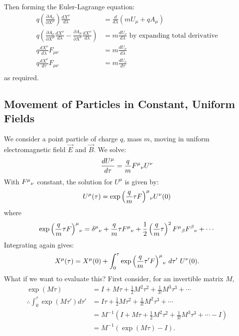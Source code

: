 \documentclass[../Main.tex]{subfiles}
\begin{document}
Then forming the Euler-Lagrange equation:
\begin{align*}
    q \left(\frac{\partial A_\nu}{\partial X^\mu}\right) \frac{dX^\nu}{d\lambda} &= \frac{d}{d\lambda}\left(mU_\mu + qA_\mu\right) \\
    q\left(\frac{\partial A_\nu}{\partial X^\mu} \frac{dX^\nu}{d\lambda} - \frac{\partial A_\mu}{\partial X^\nu} \frac{dX^\nu}{d\lambda}\right) &= m \frac{dU_\nu}{d\lambda} \text{ by expanding total derivative}\\
    q \frac{dX^\nu}{d\lambda} F_{\mu \nu} &= m \frac{dU_\nu}{d\lambda} \\
    q \frac{dX^\nu}{d\tau} F_{\mu \nu} &= m \frac{dU_\nu}{d\tau} \\
\end{align*}
as required.
\subsection{Movement of Particles in Constant, Uniform Fields}
We consider a point particle of charge $q$, mass $m$, moving in uniform electromagnetic field $\vec{E}$ and $\vec{B}$. We solve:
\begin{equation}
    \frac{dU^\mu}{d\tau} = \frac{q}{m} \indx{F}{\mu}{\nu} U^\nu
    \label{eqnForceRelLorentz2}
\end{equation}
With $\indx{F}{\mu}{\nu}$ constant, the solution for $U^\mu$ is given by:
\begin{equation*}
    U^\mu(\tau) = \indx{\exp\left(\frac{q}{m} \tau F\right)}{\mu}{\nu}U^\nu(0)
\end{equation*}
where
\begin{equation*}
    \indx{\exp\left(\frac{q}{m} \tau F\right)}{\mu}{\nu} = \indx\delta\mu\nu + \frac{q}{m}\tau \indx{F}\mu\nu + \frac12 \left(\frac{q}{m}\tau\right)^2 \indx{F}\mu\beta \indx{F}\beta\nu + \cdots
\end{equation*}
Integrating again gives:
\begin{equation*}
    X^\mu(\tau) = X^\mu(0) + \int_{0}^{\tau} \indx{\exp\left(\frac{q}{m} \tau' F\right)}{\mu}{\nu} ~d\tau'~U^\nu(0).
\end{equation*}
What if we want to evaluate this? First consider, for an invertible matrix $M$,
\begin{align*}
    \exp(M\tau) &= I + M\tau + \frac12 M^2\tau^2 + \frac1{3!} M^3 \tau^3 + \cdots \\
    \therefore \int_{0}^{\tau} \exp(M\tau') d\tau' &= I\tau + \frac12 M\tau^2 + \frac1{3!}M^2 \tau^3 + \cdots \\
    &= M^{-1} \left(I + M\tau + \frac12 M^2 \tau^2 + \frac1{3!} M^3 \tau^3 + \cdots - I\right) \\
    &= M^{-1} \left(\exp(M\tau) - I\right).
\end{align*}
\end{document}
